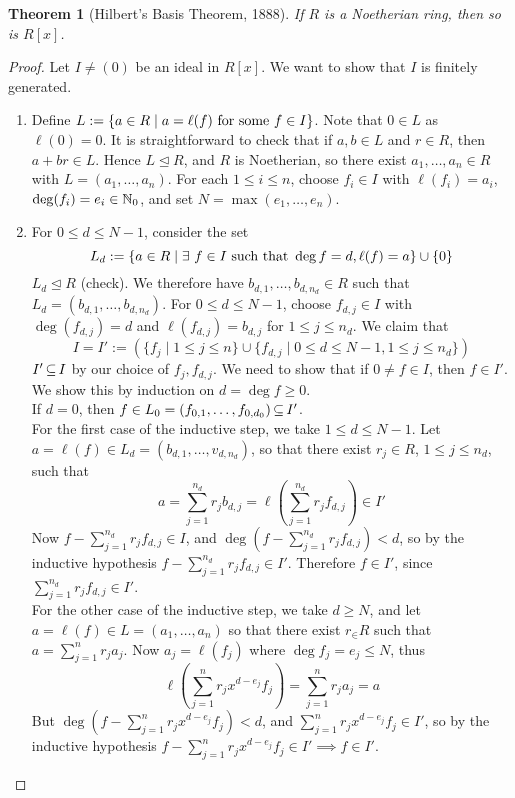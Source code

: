 \documentclass[11pt]{book}
\newcounter{counter}
\newtheorem{theorem}[counter]{Theorem}   \newtheorem*{theorem*}{Theorem}   \newtheorem{lemma}[counter]{Lemma}   \newtheorem{corollary}[counter]{Corollary}
\theoremstyle{definition}   \newtheorem{defn}[counter]{Definition} %
\newcommand{\nsg}{\mathrel{\unlhd}}   \newcommand{\ind}{\parindent24pt}   \newcommand{\vn}{\varnothing}
\newcommand{\vs}{\vspace{8pt}}
\numberwithin{counter}{chapter}
\begin{document}
\vs

\begin{theorem}[Hilbert's Basis Theorem, 1888]
If $R$ is a Noetherian ring, then so is $R[x]$.
\end{theorem}

\begin{proof}
Let $I \ne (0)$ be an ideal in $R[x]$. We want to show that $I$ is finitely generated.
\begin{enumerate}
\item[\tb{Step 1.}] Define $L := \{a \in R \mid a = \ell(f) \textnormal{ for some } f \in I\}$. Note that $0 \in L$ as $\ell(0) = 0$. It is straightforward to check that if $a,b \in L$ and $r \in R$, then $a+br \in L$. Hence $L \nsg R$, and $R$ is Noetherian, so there exist $a_1,\dots,a_n \in R$ with $L = (a_1,\dots,a_n)$. For each $1 \leq i \leq n$, choose $f_i \in I$ with $\ell(f_i) = a_i$, $\deg (f_i) = e_i \in \operatorname{\mathbb{N}}_0$, and set $N = \max(e_1,\dots,e_n)$.

\item[\tb{Setp 2.}] For $0 \leq d \leq N-1$, consider the set
	\[L_d := \{a \in R \mid \exists \ f \in I \textnormal{ such that } \deg f = d, \ell(f) = a \} \cup \{0\} \]
$L_d \nsg R$ (check). We therefore have $b_{d,1},\dots,b_{d,n_d} \in R$ such that $L_d = (b_{d,1},\dots,b_{d,n_d})$. For $0 \leq d \leq N-1$, choose $f_{d,j} \in I$ with $\deg(f_{d,j}) = d$ and $\ell(f_{d,j}) = b_{d,j}$ for $1 \leq j \leq n_d$. We claim that
	\[I = I' := (\{f_j \mid 1 \leq j \leq n\} \cup \{f_{d,j} \mid 0 \leq d \leq N-1, 1 \leq j \leq n_d\})\]
$I' \operatorname{\subseteq} I$ by our choice of $f_j, f_{d,j}$. We need to show that if $0 \ne f \in I$, then $f \in I'$. We show this by induction on $d = \deg f \geq 0$. \\

If $d = 0$, then $f \in L_0 = (f_{0,1},\dots,f_{0,d_0}) \operatorname{\subseteq} I'$. \\

For the first case of the inductive step, we take $1 \leq d \leq N-1$. Let $a = \ell(f) \in L_d = (b_{d,1},\dots,v_{d,n_d})$, so that there exist $r_j \in R$, $1 \leq j \leq n_d$, such that
	\[a = \sum_{j=1}^{n_d} r_j b_{d,j} = \ell\left(\sum_{j=1}^{n_d} r_j f_{d,j} \right) \in I' \]
Now $f - \sum_{j=1}^{n_d} r_j f_{d,j} \in I$, and $\deg \left( f - \sum_{j=1}^{n_d} r_j f_{d,j}\right) < d$, so by the inductive hypothesis $f - \sum_{j=1}^{n_d} r_j f_{d,j} \in I'$. Therefore $f \in I'$, since $\sum_{j=1}^{n_d} r_j f_{d,j} \in I'$. \\

For the other case of the inductive step, we take $d \geq N$, and let $a = \ell(f) \in L = (a_1,\dots,a_n)$ so that there exist $r_ \in R$ such that $a = \sum_{j=1}^n r_j a_j$. Now $a_j = \ell(f_j)$ where $\deg f_j = e_j \leq N$, thus
	\[\ell \left(\sum_{j=1}^n r_j x^{d-e_j} f_j\right) = \sum_{j=1}^n r_j a_j = a\]
But $\deg \left(f-\sum_{j=1}^n r_j x^{d-e_j} f_j\right) < d$, and $\sum_{j=1}^n r_j x^{d-e_j} f_j \in I'$, so by the inductive hypothesis $f - \sum_{j=1}^n r_j x^{d-e_j} f_j \in I' \implies f \in I'$.
\end{enumerate}
\end{proof}
\end{document}
